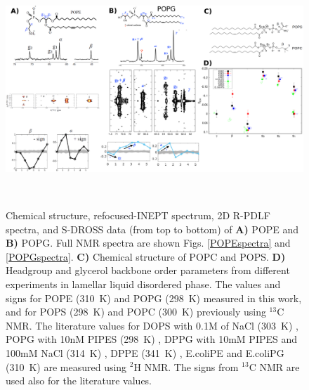 \documentclass[aps,prl,superscriptaddress,twocolumn]{revtex4}
\begin{document}
\begin{figure}[]
  \centering
   \includegraphics[width=18.0cm]{./Figs/figure1.eps}
   \caption{\label{HGorderParameters}
     Chemical structure, refocused-INEPT spectrum, 2D R-PDLF spectra, and S-DROSS data (from top to bottom) of \textbf{A)} POPE  and \textbf{B)} POPG.
      Full NMR spectra are shown Figs. \ref{POPEspectra} and \ref{POPGspectra}.
     \textbf{C)} Chemical structure of POPC and POPS.
    \textbf{D)} Headgroup and glycerol backbone order parameters from different experiments in lamellar liquid disordered phase.
    The values and signs for POPE (310~K) and POPG (298~K)
    measured in this work, and for POPS (298~K) \cite{antila19} and POPC (300~K) \cite{ferreira13,ferreira16}
    previously using $^{13}$C NMR. The literature values for
    DOPS with 0.1M of NaCl (303~K) \cite{browning80},
    POPG with 10nM PIPES (298~K) \cite{borle85},
    DPPG with 10mM PIPES and 100mM NaCl (314~K) \cite{wohlgemuth80}, 
    DPPE (341~K) \cite{seelig76},
    E.coliPE and E.coliPG (310~K) \cite{gally81}
    are measured using $^2$H NMR. The signs from $^{13}$C NMR are used also for the literature values.
   }
    \\
\end{figure}
\end{document}
